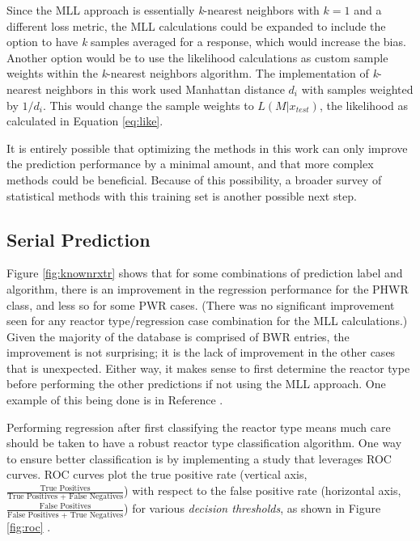 Since the \gls{MLL} approach is essentially \textit{k}-nearest neighbors with
$k=1$ and a different loss metric, the \gls{MLL} calculations could be expanded
to include the option to have \textit{k} samples averaged for a response, which
would increase the bias.  Another option would be to use the likelihood
calculations as custom sample weights within the \textit{k}-nearest neighbors
algorithm. The implementation of \textit{k}-nearest neighbors in this work used
Manhattan distance $d_i$ with samples weighted by $1/d_i$. This would change
the sample weights to $L(M|x_{test})$, the likelihood as calculated in Equation
\ref{eq:like}.

It is entirely possible that optimizing the methods in this work can only
improve the prediction performance by a minimal amount, and that more complex
methods could be beneficial. Because of this possibility, a broader survey of
statistical methods with this training set is another possible next step. 

\subsection{Serial Prediction}

Figure \ref{fig:knownrxtr} shows that for some combinations of prediction label
and algorithm, there is an improvement in the regression performance for the
\gls{PHWR} class, and less so for some \gls{PWR} cases.  (There was no
significant improvement seen for any reactor type/regression case combination
for the \gls{MLL} calculations.) Given the majority of the database is
comprised of \gls{BWR} entries, the improvement is not surprising; it is the
lack of improvement in the other cases that is unexpected. Either way, it makes
sense to first determine the reactor type before performing the other
predictions if not using the \gls{MLL} approach. One example of this being
done is in Reference \cite{serial_ml}.

Performing regression after first classifying the reactor type means much care
should be taken to have a robust reactor type classification algorithm. One way
to ensure better classification is by implementing a study that leverages
\gls{ROC} curves. \Gls{ROC} curves plot the true positive rate (vertical axis,
$\frac{\text{True Positives}}{\text{True Positives + False Negatives}}$) with
respect to the false positive rate (horizontal axis, $\frac{\text{False
Positives}}{\text{False Positives + True Negatives}}$) for various
\textit{decision thresholds}, as shown in Figure \ref{fig:roc} \cite{roc}.

